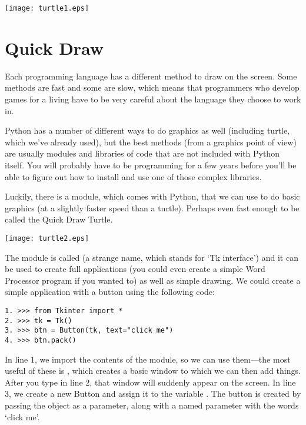 \begin{center}
\texttt{[image: turtle1.eps]}
\end{center}

\section{Quick Draw}

Each programming language has a different method to draw on the screen. Some methods are fast and some are slow, which means that programmers who develop games for a living have to be very careful about the language they choose to work in.
\par
Python has a number of different ways to do graphics as well (including turtle, which we've already used), but the best methods (from a graphics point of view) are usually modules and libraries of code that are not included with Python itself. You will probably have to be programming for a few years before you'll be able to figure out how to install and use one of those complex libraries.

Luckily, there is a module, which comes with Python, that we can use to do basic graphics (at a slightly faster speed than a turtle).  Perhaps even fast enough to be called the Quick Draw Turtle.

\begin{center}
\texttt{[image: turtle2.eps]}
\end{center}

The module is called  (a strange name, which stands for `Tk interface') and it can be used to create full applications (you could even create a simple Word Processor program if you wanted to) as well as simple drawing. We could create a simple application with a button using the following code:

\begin{listing}
\begin{verbatim}
1. >>> from Tkinter import *
2. >>> tk = Tk()
3. >>> btn = Button(tk, text="click me")
4. >>> btn.pack()
\end{verbatim}
\end{listing}

In line 1,  we import the contents of the  module, so we can use them---the most useful of these is , which creates a basic window to which we can then add things. After you type in line 2, that window will suddenly appear on the screen.  In line 3, we create a new Button and assign it to the variable . The button is created by passing the  object as a parameter, along with a named parameter with the words `click me'.

